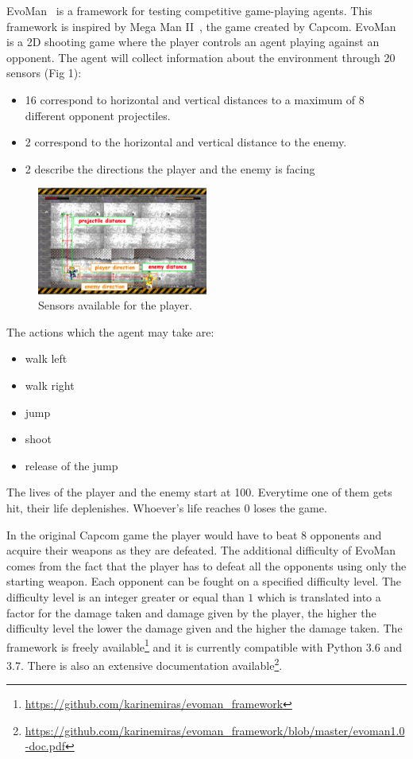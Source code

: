 \documentclass[conference]{IEEEtran}
\begin{document}
    EvoMan~\cite{karinemiras,evoman} is a framework for testing competitive game-playing agents.
    This framework is inspired by Mega Man II~\cite{capcom}, the game created by Capcom.
    EvoMan is a 2D shooting game where the player controls an agent playing against an opponent.
    The agent will collect information about the environment through 20 sensors (Fig 1):
    \begin{itemize}
        \item 16 correspond to horizontal and vertical distances to a maximum of 8 different opponent projectiles.
        \item 2 correspond to the horizontal and vertical distance to the enemy.
        \item 2 describe the directions the player and the enemy is facing
    \end{itemize}
    \begin{figure}
        \centering
        \includegraphics[width=0.5\textwidth]{images/Evoman3.png}
        \caption{Sensors available for the player\cite{evoman}.}
        \label{fig:sensors}
    \end{figure}
    The actions which the agent may take are:
    \begin{itemize}
        \item walk left
        \item walk right
        \item jump
        \item shoot
        \item release of the jump
    \end{itemize}

    The lives of the player and the enemy start at 100.
    Everytime one of them gets hit, their life deplenishes.
    Whoever's life reaches 0 loses the game.

    In the original Capcom game the player would have to beat $8$ opponents and acquire their weapons
    as they are defeated.
    The additional difficulty of EvoMan comes from the fact that the player has to defeat all
    the opponents using only the starting weapon.
    Each opponent can be fought on a specified difficulty level.
    The difficulty level is an integer greater or equal than $1$ which is translated into a factor for the damage
    taken and damage given by the player, the higher the difficulty level the lower the damage given and the higher the damage taken.
    The framework is freely available\footnote{\url{https://github.com/karinemiras/evoman_framework}}
    and it is currently compatible with Python 3.6 and 3.7.
    There is also an extensive documentation
    available\footnote{\url{https://github.com/karinemiras/evoman_framework/blob/master/evoman1.0-doc.pdf}}.
\end{document}
